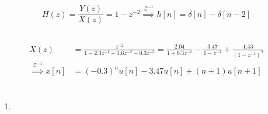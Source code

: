 \documentclass{article}
\begin{document}
\subsection{}

\begin{equation}
    H(z) = \frac{Y(z)}{X(z)} = 1 - z^{-2} \overset{\mathcal{Z}^{-1}}{\implies} h[n] = \delta[n] - \delta[n - 2]
\end{equation}

\subsection{}

\begin{align}
    X(z) &= \frac{z^{-2}}{1 - 2.3z^{-1} + 1.6z^{-2} - 0.3z^{-3}} = \frac{2.04}{1 + 0.3z^{-1}} - \frac{3.47}{1 - z^{-1}} + \frac{1.43}{(1 - z^{-1})^2} \\
    \overset{\mathcal{Z}^{-1}}{\implies} x[n] &= (-0.3)^n u[n] - 3.47 u[n] + (n + 1) u[n + 1]
\end{align}

\section{}

\begin{enumerate}
    \item %
\end{enumerate}
\end{document}
